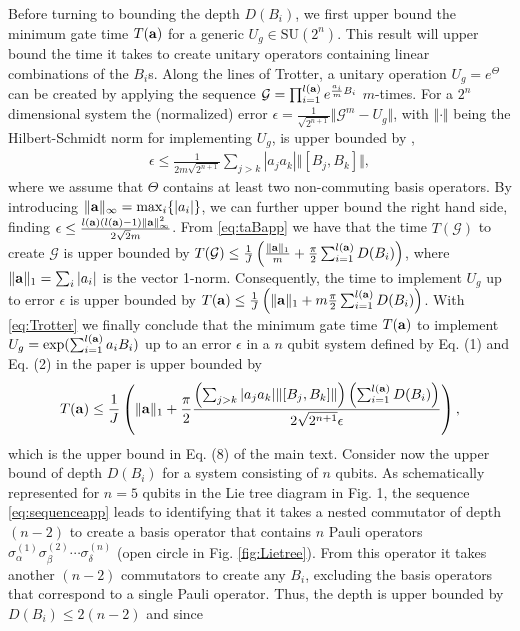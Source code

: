 \documentclass[aps,twocolumn,amsmath,amssymb,nofootinbib,superscriptaddress]{revtex4-1}
\begin{document}
Before turning to bounding the depth $D(B_{i})$, we first upper bound the minimum gate time $T(\bold{a})$ for a generic $U_{g}\in \text{SU}(2^{n})$. This result will upper bound the time it takes to create unitary operators containing linear combinations of the $B_{i}$s. Along the  lines of Trotter, a unitary operation $U_{g}=e^{\Theta}$ can be created by applying the sequence $\mathcal G=\prod_{i=1}^{l(\bold{a})}e^{\frac{a_{i}}{m}B_{i}}$ $m$-times. For a $2^{n}$ dimensional system the (normalized) error $\epsilon=\frac{1}{\sqrt{2^{n+1}}}\Vert\mathcal G^{m}-U_{g} \Vert$, with $\Vert\cdot\Vert$ being the Hilbert-Schmidt norm for implementing $U_{g}$, is upper bounded by \cite{Trotter}, 
\begin{align}
\label{eq:Trotter}
\epsilon\leq \frac{1}{2m\sqrt{2^{n+1}}}\sum_{j>k}|a_{j}a_{k}|\Vert[B_{j},B_{k}]\Vert,	
\end{align}
where we assume that $\Theta$ contains at least two non-commuting basis operators. 
By introducing $\Vert\bold{a}\Vert_{\infty}= \max_{i}\{|a_{i}|\}$, we can further upper bound the right hand side, finding $\epsilon\leq \frac{l(\bold{a})(l(\bold{a})-1)\Vert\bold{a}\Vert_{\infty}^{2}}{2\sqrt{2}m}$. From \eqref{eq:taBapp} we have that the time $T(\mathcal G)$ to create $\mathcal G$ is upper bounded by $T(\mathcal G)\leq \frac{1}{J}\left(\frac{\Vert{\bold{a}}\Vert_{1}}{m}+\frac{\pi}{2}\sum_{i=1}^{l(\bold{a})}D(B_{i})\right)$,  where $\Vert\bold{a}\Vert_{1}=\sum_{i}|a_{i}|$ is the vector 1-norm. Consequently, the time to implement $U_{g}$ up to error $\epsilon$ is upper bounded by $T(\bold{a})\leq \frac{1}{J} \left(\Vert\bold{a}\Vert_{1}+m\frac{\pi}{2}\sum_{i=1}^{l(\bold{a})}D(B_{i})\right)$. With \eqref{eq:Trotter} we finally conclude that the minimum gate time $T(\bold{a})$ to implement $U_{g}=\exp(\sum_{i=1}^{l(\bold{a})}a_{i}B_{i})$ up to an error $\epsilon$ in a $n$ qubit system defined by Eq. (1) and Eq. (2) in the paper is upper bounded by  
\begin{align}
T(\bold{a})\leq \frac{1}{J}\left(\Vert\bold{a}\Vert_{1}+\frac{\pi}{2}\frac{\left(\sum_{j>k}|a_{j}a_{k}|\Vert[B_{j},B_{k}]\Vert\right)\left(\sum_{i=1}^{l(\bold{a})}D(B_{i})\right)}{2\sqrt{2^{n+1}}\epsilon}  \right),
\end{align}
which is the upper bound in Eq. (8) of the main text. Consider now the upper bound of depth $D(B_{i})$ for a system consisting of $n$ qubits. As schematically represented for $n=5$ qubits in the Lie tree diagram \cite{Elliot, Carenzspinstar} in Fig. 1, the sequence \eqref{eq:sequenceapp} leads to identifying that it takes a nested commutator of depth $(n-2)$ to create a basis operator that contains $n$ Pauli operators $\sigma_{\alpha}^{(1)}\sigma_{\beta}^{(2)}\cdots\sigma_{\delta}^{(n)}$ (open circle in Fig. \ref{fig:Lietree}). From this operator it takes another $(n-2)$ commutators to create any $B_{i}$, excluding the basis operators that correspond to a single Pauli operator. Thus, the depth is upper bounded by $D(B_{i})\leq 2(n-2)$ and since 
\end{document}
